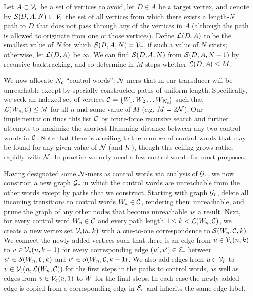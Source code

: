 \documentclass[english]{article}
\begin{document}
Let $A \subset {\cal V}_r$ be a set of vertices to avoid,
let $D \in A$ be a target vertex,
and denote by ${\cal S}(D,A,N) \subset {\cal V}_r$
the set of all vertices
from which there exists a length-$N$ path to $D$
that does not pass through any of the vertices in $A$
(although the path is allowed to originate from one of those vertices).
Define ${\cal L}(D,A)$ to be the smallest value of $N$ for which ${\cal S}(D,A,N) = {\cal V}_r$,
if such a value of $N$ exists; otherwise, let ${\cal L}(D,A)$ be $\infty$.
We can find ${\cal S}(D,A,N)$ from ${\cal S}(D,A,N-1)$ by recursive backtracking,
and so determine in $M$ steps whether ${\cal L}(D,A) \leq M$.

We now allocate $N_c$ ``control words'': ${\cal N}$-mers that in our transducer
will be unreachable except by specially constructed paths of uniform length.
Specifically, we seek an indexed set of vertices
${\cal C} = \{ W_1, W_2 \ldots W_{N_c} \}$
such that ${\cal L}(W_n,{\cal C}) \leq M$ for all $n$
and some value of $M$ (e.g. $M = 2{\cal N}$).
Our implementation finds this list ${\cal C}$ by brute-force recursive search
and further attempts to maximize the shortest Hamming distance between any two control words in ${\cal C}$.
Note that there is a ceiling to the number of control words that may be found
for any given value of ${\cal N}$ (and $K$),
though this ceiling grows rather rapidly with ${\cal N}$.
In practice we only need a few control words for most purposes.

Having designated some ${\cal N}$-mers as control words via analysis of ${\cal G}_r$,
we now construct a new graph ${\cal G}_c$
in which the control words are unreachable from the other words
except by paths that we construct.
Starting with graph ${\cal G}_r$, delete all incoming transitions to control words $W_n \in {\cal C}$,
rendering them unreachable,
and prune the graph of any other nodes that become unreachable as a result.
Next, for every control word $W_n \in {\cal C}$
and every path length $1 \leq k < {\cal L}(W_n,{\cal C})$,
we create a new vertex set ${\cal V}_c(n,k)$
with a one-to-one correspondence to ${\cal S}(W_n,{\cal C},k)$.
We connect the newly-added vertices such that there is an edge from
$u \in {\cal V}_c(n,k)$ to $v \in {\cal V}_c(n,k-1)$
for every corresponding edge $(u',v') \in {\cal E}_r$ between
$u' \in {\cal S}(W_n,{\cal C},k)$
and
$v' \in {\cal S}(W_n,{\cal C},k-1)$.
We also add edges from
$u \in {\cal V}_r$ to $v \in {\cal V}_c(n,{\cal L}(W_n,{\cal C}))$
for the first steps in the paths to control words,
as well as edges from
$u \in {\cal V}_c(n,1)$ to $W$
for the final steps.
In each case the newly-added edge is copied from a corresponding edge in ${\cal E}_r$
and inherits the same edge label.
\end{document}
